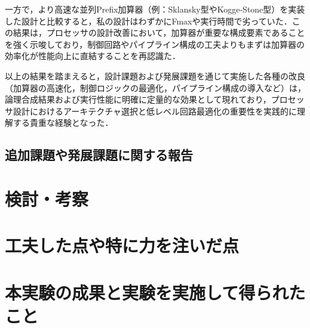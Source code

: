 \documentclass[autodetect-engine,dvi=dvipdfmx,ja=standard,
               a4j,11pt]{bxjsarticle}
\begin{document}
一方で，より高速な並列Prefix加算器（例：Sklansky型やKogge-Stone型）を実装した設計と比較すると，私の設計はわずかにFmaxや実行時間で劣っていた．この結果は，プロセッサの設計改善において，加算器が重要な構成要素であることを強く示唆しており，制御回路やパイプライン構成の工夫よりもまずは加算器の効率化が性能向上に直結することを再認識た．

以上の結果を踏まえると，設計課題および発展課題を通じて実施した各種の改良（加算器の高速化，制御ロジックの最適化，パイプライン構成の導入など）は，論理合成結果および実行性能に明確に定量的な効果として現れており，プロセッサ設計におけるアーキテクチャ選択と低レベル回路最適化の重要性を実践的に理解する貴重な経験となった．

     
\subsection{追加課題や発展課題に関する報告}\label{tuika_hatten}
\section{検討・考察}
\section{工夫した点や特に力を注いだ点}
\section{本実験の成果と実験を実施して得られたこと}
\end{document}

